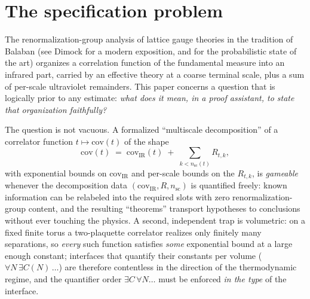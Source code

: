 \documentclass[11pt]{article}
\theoremstyle{definition}
\begin{document}
\section{The specification problem}\label{sec:spec}

The renormalization-group analysis of lattice gauge theories in the
tradition of Balaban \cite{Bal87,Bal88a,Bal88b,Bal89} (see Dimock
\cite{Dim13a,Dim13b,Dim14} for a modern exposition, and
\cite{Cha19,Cha26} for the probabilistic state of the art) organizes a
correlation function of the fundamental measure into an infrared part,
carried by an effective theory at a coarse terminal scale, plus a sum
of per-scale ultraviolet remainders.  This paper concerns a question
that is logically prior to any estimate: \emph{what does it mean, in a
proof assistant, to state that organization faithfully?}

The question is not vacuous.  A formalized ``multiscale
decomposition'' of a correlator function
$t \mapsto \mathrm{cov}(t)$ of the shape
\begin{equation}\label{eq:decomp}
\mathrm{cov}(t) \;=\; \mathrm{cov}_{\mathrm{IR}}(t)
  \;+\; \sum_{k < n_{\mathrm{sc}}(t)} R_{t,k},
\end{equation}
with exponential bounds on $\mathrm{cov}_{\mathrm{IR}}$ and per-scale
bounds on the $R_{t,k}$, is \emph{gameable} whenever the decomposition
data $(\mathrm{cov}_{\mathrm{IR}}, R, n_{\mathrm{sc}})$ is quantified
freely: known information can be relabeled into the required slots
with zero renormalization-group content, and the resulting
``theorems'' transport hypotheses to conclusions without ever touching
the physics.  A second, independent trap is volumetric: on a fixed
finite torus a two-plaquette correlator realizes only finitely many
separations, so \emph{every} such function satisfies \emph{some}
exponential bound at a large enough constant; interfaces that
quantify their constants per volume
($\forall N\, \exists C(N)\, \dots$) are therefore contentless in the
direction of the thermodynamic regime, and the quantifier order
$\exists C\, \forall N \dots$ must be enforced \emph{in the type} of
the interface.
\end{document}
